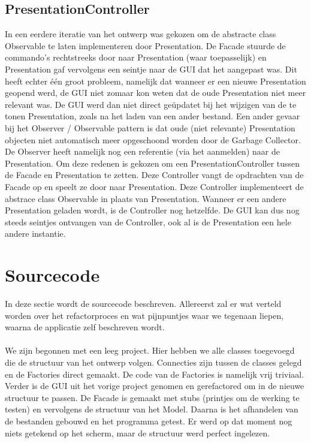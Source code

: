 \documentclass[a4paper]{article}
\newcommand{\1}[0]{\'{e}\'{e}n}
\begin{document}
\subsection{PresentationController}
\label{sub:presCntrllr}
In een eerdere iteratie van het ontwerp was gekozen om de abstracte class Observable te laten implementeren door Presentation. De Facade stuurde de commando's rechtstreeks door naar Presentation (waar toepasselijk) en Presentation gaf vervolgens een seintje naar de GUI dat het aangepast was. Dit heeft echter \1 groot probleem, namelijk dat wanneer er een nieuwe Presentation geopend werd, de GUI niet zomaar kon weten dat de oude Presentation niet meer relevant was. De GUI werd dan niet direct ge\"{u}pdatet bij het wijzigen van de te tonen Presentation, zoals na het laden van een ander bestand. Een ander gevaar bij het Observer / Observable pattern is dat oude (niet relevante) Presentation objecten niet automatisch meer opgeschoond worden door de Garbage Collector. De Observer heeft namelijk nog een referentie (via het aanmelden) naar de Presentation. Om deze redenen is gekozen om een PresentationController tussen de Facade en Presentation te zetten. Deze Controller vangt de opdrachten van de Facade op en speelt ze door naar Presentation. Deze Controller implementeert de abstrace class Observable in plaats van Presentation. Wanneer er een andere Presentation geladen wordt, is de Controller nog hetzelfde. De GUI kan dus nog steeds seintjes ontvangen van de Controller, ook al is de Presentation een hele andere instantie.

\section{Sourcecode}
\label{sec:source}
In deze sectie wordt de sourcecode beschreven. Allereerst zal er wat verteld worden over het refactorproces en wat pijnpuntjes waar we tegenaan liepen, waarna de applicatie zelf beschreven wordt.
\\\\
We zijn begonnen met een leeg project. Hier hebben we alle classes toegevoegd die de structuur van het ontwerp volgen. Connecties zijn tussen de classes gelegd en de Factories direct gemaakt. De code van de Factories is namelijk vrij triviaal. Verder is de GUI uit het vorige project genomen en gerefactored om in de nieuwe structuur te passen. De Facade is gemaakt met stubs (printjes om de werking te testen) en vervolgens de structuur van het Model. Daarna is het afhandelen van de bestanden gebouwd en het programma getest. Er werd op dat moment nog niets getekend op het scherm, maar de structuur werd perfect ingelezen.
\end{document}
